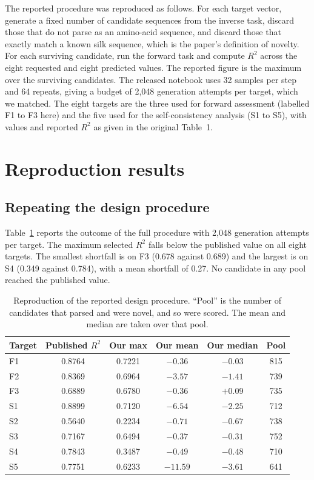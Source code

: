 \documentclass[11pt,a4paper]{article}
\begin{document}
The reported procedure was reproduced as follows. For each target vector,
generate a fixed number of candidate sequences from the inverse task, discard
those that do not parse as an amino-acid sequence, and discard those that
exactly match a known silk sequence, which is the paper's definition of novelty.
For each surviving candidate, run the forward task and compute $R^2$ across the
eight requested and eight predicted values. The reported figure is the maximum
over the surviving candidates. The released notebook uses 32 samples per step
and 64 repeats, giving a budget of 2{,}048 generation attempts per target, which
we matched. The eight targets are the three used for forward assessment (labelled
F1 to F3 here) and the five used for the self-consistency analysis (S1 to S5),
with values and reported $R^2$ as given in the original Table~1.

\section{Reproduction results}

\subsection{Repeating the design procedure}
\label{sec:table1}

Table~\ref{tab:table1} reports the outcome of the full procedure with 2{,}048
generation attempts per target. The maximum selected $R^2$ falls below the
published value on all eight targets. The smallest shortfall is on F3 (0.678
against 0.689) and the largest is on S4 (0.349 against 0.784), with a mean
shortfall of 0.27. No candidate in any pool reached the published value.

\begin{table}[htbp]
\centering
\small
\caption{Reproduction of the reported design procedure. ``Pool'' is the number
of candidates that parsed and were novel, and so were scored. The mean and
median are taken over that pool.}
\label{tab:table1}
\begin{tabular}{lccccc}
\toprule
Target & Published $R^2$ & Our max & Our mean & Our median & Pool \\
\midrule
F1 & 0.8764 & 0.7221 & $-0.36$ & $-0.03$ & 815 \\
F2 & 0.8369 & 0.6964 & $-3.57$ & $-1.41$ & 739 \\
F3 & 0.6889 & 0.6780 & $-0.36$ & $+0.09$ & 735 \\
S1 & 0.8899 & 0.7120 & $-6.54$ & $-2.25$ & 712 \\
S2 & 0.5640 & 0.2234 & $-0.71$ & $-0.67$ & 738 \\
S3 & 0.7167 & 0.6494 & $-0.37$ & $-0.31$ & 752 \\
S4 & 0.7843 & 0.3487 & $-0.49$ & $-0.48$ & 710 \\
S5 & 0.7751 & 0.6233 & $-11.59$ & $-3.61$ & 641 \\
\bottomrule
\end{tabular}
\end{table}
\end{document}
